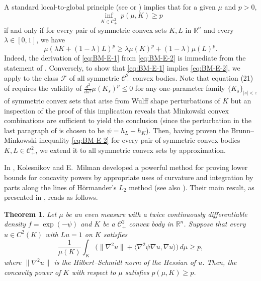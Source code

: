 \documentclass[11pt,leqno]{article}
\newtheorem{theorem}{Theorem}[section]
\theoremstyle{definition}
\theoremstyle{remark}
\numberwithin{equation}{section}
\newcommand{\ls}{\leqslant}
\newcommand{\gr}{\geqslant}
\newcommand{\1}{\textbf{1}}
\newcommand{\R}{\mathbb{R}}
\newcommand{\e}{\varepsilon}
\def\e{\varepsilon}
\begin{document}
A standard local-to-global principle (see \cite[Section 3]{Kolesnikov-Milman-2022} or \cite[Lemma~3.1]{Kolesnikov-Livshyts-2021}) implies that for a given $\mu$ and $p>0$,
\begin{equation} \label{eq:BM-E-1}
\inf_{K\in \mathcal{C}_+^2} \ p(\mu,K) \gr  p
\end{equation}
if and only if for every pair of symmetric convex sets $K,L$ in $\R^n$ and every $\lambda\in[0,1]$, we have
\begin{equation} \label{eq:BM-E-2}
\mu(\lambda K+(1-\lambda)L)^p \gr  \lambda \mu(K)^p + (1-\lambda)\mu(L)^p.
\end{equation}
Indeed, the derivation of \eqref{eq:BM-E-1} from \eqref{eq:BM-E-2} is immediate from the statement of \cite[Lemma~3.1]{Kolesnikov-Livshyts-2021}. Conversely, to show that \eqref{eq:BM-E-1} implies \eqref{eq:BM-E-2}, we apply \cite[Lemma~3.1]{Kolesnikov-Livshyts-2021} to the class $\mathcal{F}$ of all symmetric $\mathcal{C}_+^2$ convex bodies. Note that equation (21) of \cite{Kolesnikov-Livshyts-2021} requires the validity of $\frac{d^2}{d s^2} \mu(K_s)^p \ls 0$ for any one-parameter family $\{K_s\}_{|s|<\e}$ of symmetric convex sets that arise from Wulff shape perturbations of $K$ but an inspection of the proof of this implication reveals that Minkowski convex combinations are sufficient to yield the conclusion (since the perturbation in the last paragraph of \cite[Proof of Lemma~3.1]{Kolesnikov-Livshyts-2021} is chosen to be $\psi=h_L-h_K$). Then, having proven the Brunn--Minkowski inequality \eqref{eq:BM-E-2} for every pair of symmetric convex bodies $K,L \in \mathcal{C}_+^2$, we extend it to all symmetric convex sets by approximation.

In \cite{Kolesnikov-Milman-2018}, Kolesnikov and E.~Milman developed a powerful method for proving lower bounds for concavity powers by appropriate uses of curvature and integration by parts along the lines of H\"ormander's $L_2$ method (see also \cite[Section~2]{Cordero-Eskenazis-2025}). Their main result, as presented in \cite[Proof of Lemma~2.3]{Kolesnikov-Livshyts-2021}, reads as follows.

\begin{theorem}\label{th:KL}
Let $\mu$ be an even measure with a twice continuously differentiable density $f=\exp(-\psi)$ and $K$ be a $\mathcal{C}_+^2$ convex body in $\R^n$. Suppose that every $u\in C^2(K)$ with $Lu=1$ on $K$ satisfies
\begin{equation} \label{eq:BM-E-3}
\frac{1}{\mu(K)}\int_K \big(\|\nabla^2 u\| + \langle \nabla^2\psi \nabla u, \nabla u\rangle\big)\,d\mu \gr  p,
\end{equation}
where $\|\nabla^2u\|$ is the Hilbert--Schmidt norm of the Hessian of $u$. Then, the concavity power of $K$ with respect to $\mu$ satisfies $p(\mu,K)\gr  p$.
\end{theorem}
\end{document}
